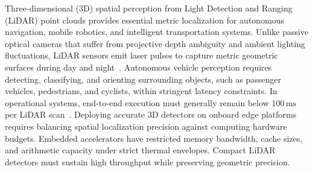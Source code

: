 
Three-dimensional (3D) spatial perception from Light Detection and Ranging (LiDAR) point clouds provides essential metric localization for autonomous navigation, mobile robotics, and intelligent transportation systems. Unlike passive optical cameras that suffer from projective depth ambiguity and ambient lighting fluctuations, LiDAR sensors emit laser pulses to capture metric geometric surfaces during day and night~\cite{geiger2012kitti}. Autonomous vehicle perception requires detecting, classifying, and orienting surrounding objects, such as passenger vehicles, pedestrians, and cyclists, within stringent latency constraints. In operational systems, end-to-end execution must generally remain below $100\,\text{ms}$ per LiDAR scan~\cite{yang2018pixor}. Deploying accurate 3D detectors on onboard edge platforms requires balancing spatial localization precision against computing hardware budgets. Embedded accelerators have restricted memory bandwidth, cache sizes, and arithmetic capacity under strict thermal envelopes. Compact LiDAR detectors must sustain high throughput while preserving geometric precision.

